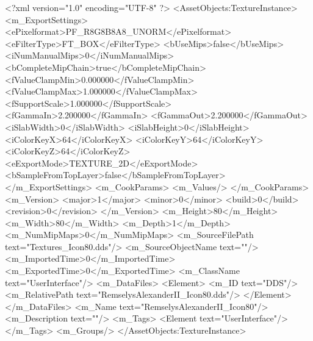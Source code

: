 <?xml version="1.0" encoding="UTF-8" ?>
<AssetObjects:TextureInstance>
	<m_ExportSettings>
		<ePixelformat>PF_R8G8B8A8_UNORM</ePixelformat>
		<eFilterType>FT_BOX</eFilterType>
		<bUseMips>false</bUseMips>
		<iNumManualMips>0</iNumManualMips>
		<bCompleteMipChain>true</bCompleteMipChain>
		<fValueClampMin>0.000000</fValueClampMin>
		<fValueClampMax>1.000000</fValueClampMax>
		<fSupportScale>1.000000</fSupportScale>
		<fGammaIn>2.200000</fGammaIn>
		<fGammaOut>2.200000</fGammaOut>
		<iSlabWidth>0</iSlabWidth>
		<iSlabHeight>0</iSlabHeight>
		<iColorKeyX>64</iColorKeyX>
		<iColorKeyY>64</iColorKeyY>
		<iColorKeyZ>64</iColorKeyZ>
		<eExportMode>TEXTURE_2D</eExportMode>
		<bSampleFromTopLayer>false</bSampleFromTopLayer>
	</m_ExportSettings>
	<m_CookParams>
		<m_Values/>
	</m_CookParams>
	<m_Version>
		<major>1</major>
		<minor>0</minor>
		<build>0</build>
		<revision>0</revision>
	</m_Version>
	<m_Height>80</m_Height>
	<m_Width>80</m_Width>
	<m_Depth>1</m_Depth>
	<m_NumMipMaps>0</m_NumMipMaps>
	<m_SourceFilePath text="Textures\RemselysAlexanderII_Icon80.dds"/>
	<m_SourceObjectName text=""/>
	<m_ImportedTime>0</m_ImportedTime>
	<m_ExportedTime>0</m_ExportedTime>
	<m_ClassName text="UserInterface"/>
	<m_DataFiles>
		<Element>
			<m_ID text="DDS"/>
			<m_RelativePath text="RemselysAlexanderII_Icon80.dds"/>
		</Element>
	</m_DataFiles>
	<m_Name text="RemselysAlexanderII_Icon80"/>
	<m_Description text=""/>
	<m_Tags>
		<Element text="UserInterface"/>
	</m_Tags>
	<m_Groups/>
</AssetObjects:TextureInstance>
